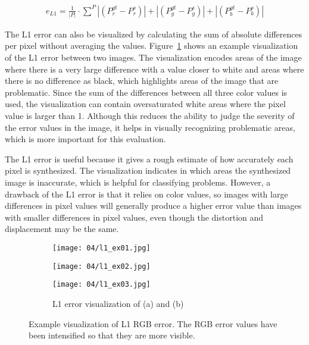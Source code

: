 \begin{align}
  e_{L1} = \frac{1}{|P|} \cdot \sum_{}^{P} |(P_r^{gt} - P_r^{s})| + |(P_g^{gt} - P_g^{s})| + |(P_b^{gt} - P_b^{s})|   \label{eq:l1}
\end{align}


The L1 error can also be visualized by calculating the sum of absolute differences per pixel without averaging the values. Figure~\ref{fig:l1_example} shows an example visualization of the L1 error between two images. The visualization encodes areas of the image where there is a very large difference with a value closer to white and areas where there is no difference as black, which highlights areas of the image that are problematic. Since the sum of the differences between all three color values is used, the visualization can contain oversaturated white areas where the pixel value is larger than 1. Although this reduces the ability to judge the severity of the error values in the image, it helps in visually recognizing problematic areas, which is more important for this evaluation.

The L1 error is useful because it gives a rough estimate of how accurately each pixel is synthesized. The visualization indicates in which areas the synthesized image is inaccurate, which is helpful for classifying problems. However, a drawback of the L1 error is that it relies on color values, so images with large differences in pixel values will generally produce a higher error value than images with smaller differences in pixel values, even though the distortion and displacement may be the same.

\begin{figure}
\centering
    \hfill
    \begin{subfigure}[t]{0.3\textwidth}
            \centering
            \texttt{[image: 04/l1\_ex01.jpg]}
            \caption{}
    \end{subfigure}%
    \hfill
    \begin{subfigure}[t]{0.3\textwidth}
            \centering
            \texttt{[image: 04/l1\_ex02.jpg]}
            \caption{}
    \end{subfigure}
    \hfill
    \begin{subfigure}[t]{0.3\textwidth}
            \centering
            \texttt{[image: 04/l1\_ex03.jpg]}
            \caption{L1 error visualization of (a) and (b)}
    \end{subfigure}%
    \hfill
    \hfill
  \caption[Example visualization of L1 RGB error]{Example visualization of L1 RGB error. The RGB error values have been intensified so that they are more visible.} \label{fig:l1_example}
\end{figure}

